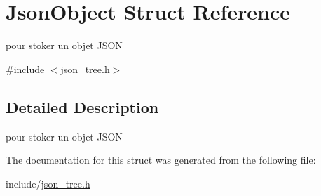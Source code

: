 \hypertarget{structJsonObject}{}\section{Json\+Object Struct Reference}
\label{structJsonObject}


pour stoker un objet J\+S\+ON  




{\ttfamily \#include $<$json\+\_\+tree.\+h$>$}



\subsection{Detailed Description}
pour stoker un objet J\+S\+ON 

The documentation for this struct was generated from the following file\+:\begin{DoxyCompactItemize}
\item 
include/\hyperlink{json__tree_8h}{json\+\_\+tree.\+h}\end{DoxyCompactItemize}
